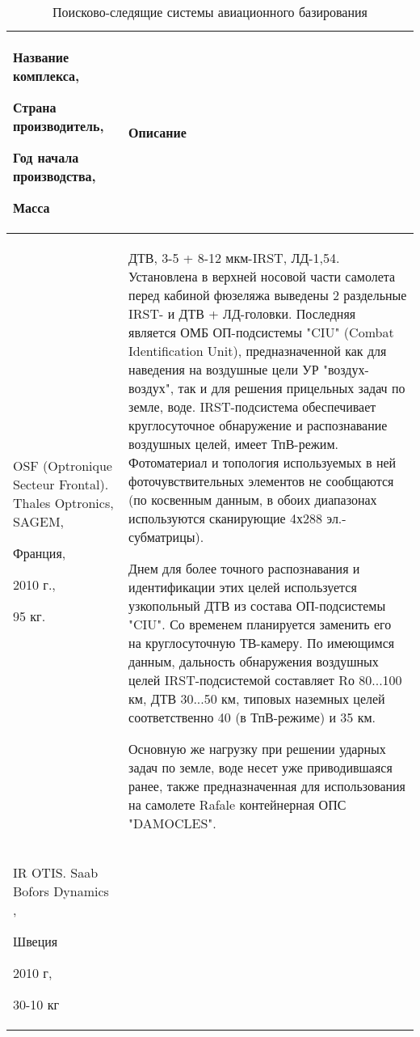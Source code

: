 \begin{landscape}

\begin{longtable}{| p{6cm} | p{18cm} |}
	\caption{Поисково-следящие системы авиационного базирования}%
	\label{tab:EOS}%
	\\ \hline
		Название комплекса, 
		
		Страна производитель, 
		
		Год начала производства, 
		
		Масса 
		& 
		Описание 
	\\ \hline
		OSF (Optronique Secteur Frontal). Thales Optronics, SAGEM, \cite[]{OSF}
		
		Франция, 
		
		2010 г., 
		
		95 кг. 
	& 
		ДТВ, 3-5 + 8-12 мкм-IRST, ЛД-1,54. Установлена в верхней носовой части самолета перед кабиной фюзеляжа выведены 2 раздельные IRST- и ДТВ + ЛД-головки. Последняя является ОМБ ОП-подсистемы "CIU" (Combat Identification Unit), предназначенной как для наведения на воздушные цели УР "воздух-воздух", так и для решения прицельных задач по земле, воде. 
		IRST-подсистема обеспечивает круглосуточное обнаружение и распознавание воздушных целей, имеет ТпВ-режим. Фотоматериал и топология используемых в ней фоточувствительных элементов не сообщаются (по косвенным данным, в обоих диапазонах используются сканирующие 4х288 эл.-субматрицы). 
		
		
		Днем для более точного распознавания и идентификации этих целей используется узкопольный ДТВ из состава ОП-подсистемы "CIU". Со временем планируется заменить его на круглосуточную ТВ-камеру. По имеющимся данным, дальность обнаружения воздушных целей IRST-подсистемой составляет Rо 80...100 км, ДТВ 30...50 км, типовых наземных целей соответственно 40 (в ТпВ-режиме) и 35 км. 
		
		Основную же нагрузку при решении ударных задач по земле, воде несет уже приводившаяся ранее, также предназначенная для использования на самолете Rafale контейнерная ОПС "DAMOCLES".
	\\ \hline
		IR OTIS. Saab Bofors Dynamics \cite[]{doi:10.1117/12.450557},
		
		Швеция	
		
		2010 г,	
		
		30-10 кг
		 

\end{longtable}
\end{landscape}
